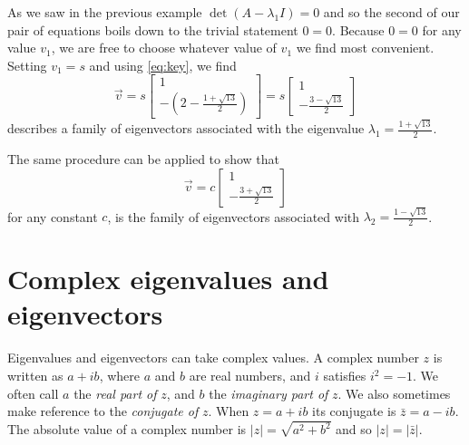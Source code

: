 \documentclass[../book.tex]{subfiles}
\begin{document}
\begin{solution}
As we saw in the previous example \(\det(A-\lambda_1 I)=0\) and so the second of our pair of equations boils down to the trivial statement \(0=0\). Because \(0=0\) for any value \(v_1\), we are free to choose whatever value of \(v_1\) we find most convenient. Setting \(v_1 = s\) and using \eqref{eq:key}, we find
\begin{equation}\label{eq:eig-14}
\vec{v}
=
s 
\begin{bmatrix}
  1 \\
  - ( 2 - \frac{1+ \sqrt{13}}{2} )
\end{bmatrix}
=
s 
\begin{bmatrix}
  1 \\
  -  \frac{3 - \sqrt{13}}{2}
\end{bmatrix}
\end{equation}
describes a family of eigenvectors associated with the eigenvalue \(\lambda_1 = \frac{1+\sqrt{13}}{2}\).

The same procedure can be applied to show that
\begin{equation}\label{eq:eig-15}
\vec{v}=
c 
\begin{bmatrix}
  1
  \\
  -  \frac{3 + \sqrt{13}}{2}
\end{bmatrix}
\end{equation}
for any constant \(c\), is the family of eigenvectors associated with \(\lambda_2 = \frac{1 - \sqrt{13}}{2}\).
\end{solution}

\section{Complex eigenvalues and eigenvectors}

Eigenvalues and eigenvectors can take complex values. A complex number \(z\) is written as \(a + i b\), where \(a\) and \(b\) are real numbers, and \(i\) satisfies \(i^2 = -1\). We often call \(a\) the \emph{real part of} \(z\), and \(b\) the \emph{imaginary part of} \(z\). We also sometimes make reference to the \emph{conjugate of} \(z\). When \(z= a+i b\) its conjugate is \(\bar z = a - i b\). The absolute value of a complex number is \(|z| = \sqrt{a^2+b^2}\) and so \(|z| = |\bar z|\).
\end{document}
